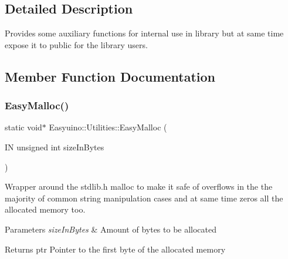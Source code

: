 \subsection{Detailed Description}
Provides some auxiliary functions for internal use in library but at same time expose it to public for the library users. 

\subsection{Member Function Documentation}
\mbox{\label{class_easyuino_1_1_utilities_a5a7991900cbc3f9e4cda1289ee7a7ee1}} 
\subsubsection{\texorpdfstring{Easy\+Malloc()}{EasyMalloc()}}
{\footnotesize\ttfamily static void$\ast$ Easyuino\+::\+Utilities\+::\+Easy\+Malloc (\begin{DoxyParamCaption}\item[{IN unsigned int}]{size\+In\+Bytes }\end{DoxyParamCaption})\hspace{0.3cm}{\ttfamily [static]}}



Wrapper around the stdlib.\+h malloc to make it safe of overflows in the the majority of common string manipulation cases and at same time zero\textquotesingle{}s all the allocated memory too. 


\begin{DoxyParams}{Parameters}
{\em size\+In\+Bytes} & Amount of bytes to be allocated \\
\hline
\end{DoxyParams}
\begin{DoxyReturn}{Returns}
ptr Pointer to the first byte of the allocated memory 
\end{DoxyReturn}
\mbox{\label{class_easyuino_1_1_utilities_a1e9c0e9ed293db6e7c3d6da6b6a40f62}} 
